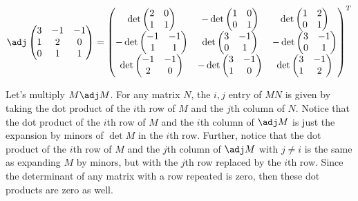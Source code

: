 \begin{example}
\[
\adj \begin{pmatrix}
3 & -1 & -1 \\
1 & 2 & 0 \\
0 & 1 & 1 \\
\end{pmatrix}
=
\begin{pmatrix}
\det \begin{pmatrix}
2 & 0 \\
1 & 1 
\end{pmatrix}
& -\det \begin{pmatrix}
1 & 0 \\
0 & 1 
\end{pmatrix}
& \det \begin{pmatrix}
1 & 2 \\
0 & 1 
\end{pmatrix}
\\
-\det \begin{pmatrix}
-1 & -1 \\
1 & 1 
\end{pmatrix}
& \det \begin{pmatrix}
3 & -1 \\
0 & 1 
\end{pmatrix}
& -\det \begin{pmatrix}
3 & -1 \\
0 & 1 
\end{pmatrix}
\\
\det \begin{pmatrix}
-1 & -1 \\
2 & 0 
\end{pmatrix}
& -\det \begin{pmatrix}
3 & -1 \\
1 & 0 
\end{pmatrix}
& \det \begin{pmatrix}
3 & -1 \\
1 & 2 
\end{pmatrix}
\\
\end{pmatrix}^T
\]
\end{example}


Let's multiply $M\adj M$.  For any matrix $N$, the $i, j$ entry of $MN$ is given by taking the dot product of the $i$th row of $M$ and the $j$th column of $N$.  
Notice that the dot product of the $i$th row of $M$ and the $i$th column of $\adj M$ is just the expansion by minors of $\det M$ in the $i$th row.
Further, notice that the dot product of the $i$th row of $M$ and the $j$th column of $\adj M$ with $j\neq i$ is the same as expanding $M$ by minors, but with the $j$th row replaced by the $i$th row.  Since the determinant of any matrix with a row repeated is zero, then these dot products are zero as well.

